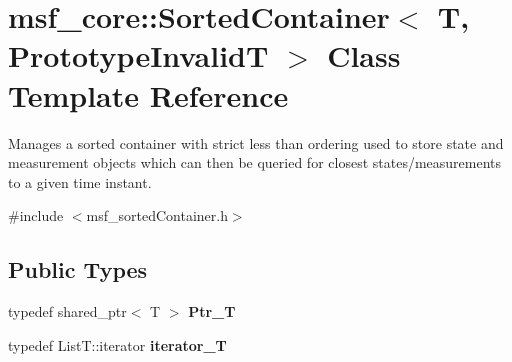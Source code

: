 \hypertarget{classmsf__core_1_1SortedContainer}{\section{msf\-\_\-core\-:\-:Sorted\-Container$<$ T, Prototype\-Invalid\-T $>$ Class Template Reference}
\label{classmsf__core_1_1SortedContainer}
}


Manages a sorted container with strict less than ordering used to store state and measurement objects which can then be queried for closest states/measurements to a given time instant.  




{\ttfamily \#include $<$msf\-\_\-sorted\-Container.\-h$>$}

\subsection*{Public Types}
\begin{DoxyCompactItemize}
\item 
\hypertarget{classmsf__core_1_1SortedContainer_a0dd7e9676bf540e11f526a8ac16da06b}{typedef shared\-\_\-ptr$<$ T $>$ {\bfseries Ptr\-\_\-\-T}}\label{classmsf__core_1_1SortedContainer_a0dd7e9676bf540e11f526a8ac16da06b}

\item 
\hypertarget{classmsf__core_1_1SortedContainer_ac060dafe3a40d73ef6d35f4be7e0213e}{typedef List\-T\-::iterator {\bfseries iterator\-\_\-\-T}}\label{classmsf__core_1_1SortedContainer_ac060dafe3a40d73ef6d35f4be7e0213e}

\end{DoxyCompactItemize}
